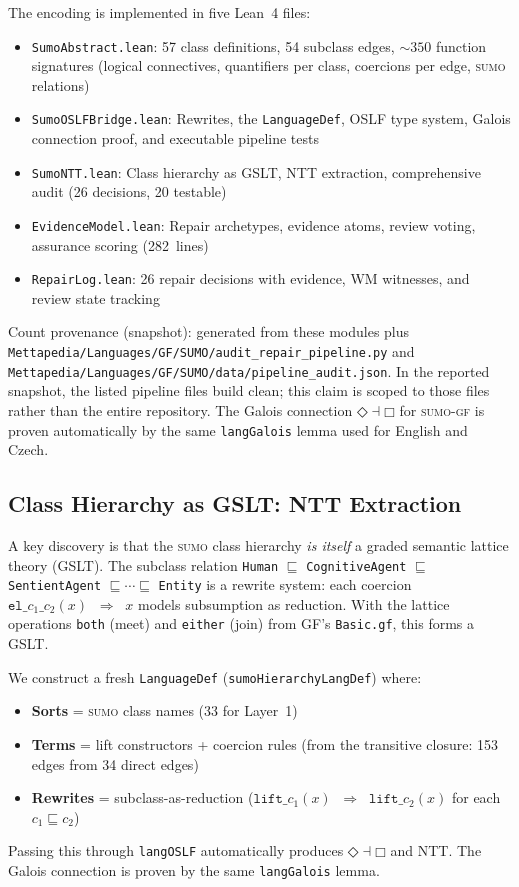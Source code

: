 \documentclass[11pt]{article}
\newcommand{\DiamondOp}{\mathbin{\Diamond}}
\newcommand{\BoxOp}{\mathbin{\Box}}
\newcommand{\Red}{\;\Rightarrow\;}
\newcommand{\SUMO}{\textsc{sumo}}
\newcommand{\GF}{\textsc{gf}}
\theoremstyle{definition}
\theoremstyle{plain}
\begin{document}
The encoding is implemented in five Lean~4 files:
\begin{itemize}[nosep]
  \item \texttt{SumoAbstract.lean}: 57 class definitions, 54 subclass
    edges, ${\sim}350$ function signatures (logical connectives,
    quantifiers per class, coercions per edge, \SUMO{} relations)
  \item \texttt{SumoOSLFBridge.lean}: Rewrites, the
    \texttt{LanguageDef}, OSLF type system, Galois connection proof,
    and executable pipeline tests
  \item \texttt{SumoNTT.lean}: Class hierarchy as GSLT, NTT
    extraction, comprehensive audit (26 decisions, 20 testable)
  \item \texttt{EvidenceModel.lean}: Repair archetypes, evidence
    atoms, review voting, assurance scoring (282~lines)
  \item \texttt{RepairLog.lean}: 26 repair decisions with evidence,
    WM witnesses, and review state tracking
\end{itemize}
Count provenance (snapshot): generated from these modules plus
\texttt{Mettapedia/Languages/GF/SUMO/audit\_repair\_pipeline.py} and
\texttt{Mettapedia/Languages/GF/SUMO/data/pipeline\_audit.json}.
In the reported snapshot, the listed pipeline files build clean; this claim is
scoped to those files rather than the entire repository.  The Galois connection
$\DiamondOp \dashv \BoxOp$ for \SUMO{}-\GF{} is proven automatically
by the same \texttt{langGalois} lemma used for English and Czech.

\subsection{Class Hierarchy as GSLT: NTT Extraction}
\label{sec:ntt-extraction}

A key discovery is that the \SUMO{} class hierarchy \emph{is itself}
a graded semantic lattice theory (GSLT).  The subclass relation
\texttt{Human} $\sqsubseteq$ \texttt{CognitiveAgent} $\sqsubseteq$
\texttt{SentientAgent} $\sqsubseteq \cdots \sqsubseteq$
\texttt{Entity} is a rewrite system: each coercion
$\texttt{el\_}c_1\texttt{\_}c_2(x) \;\Red\; x$ models subsumption as
reduction.  With the lattice operations \texttt{both} (meet) and
\texttt{either} (join) from GF's \texttt{Basic.gf}, this forms a GSLT.

We construct a fresh \texttt{LanguageDef} (\texttt{sumoHierarchyLangDef})
where:
\begin{itemize}[nosep]
  \item \textbf{Sorts} = \SUMO{} class names (33 for Layer~1)
  \item \textbf{Terms} = lift constructors + coercion rules
    (from the transitive closure: 153 edges from 34 direct edges)
  \item \textbf{Rewrites} = subclass-as-reduction
    ($\texttt{lift\_}c_1(x) \;\Red\; \texttt{lift\_}c_2(x)$
    for each $c_1 \sqsubseteq c_2$)
\end{itemize}
Passing this through \texttt{langOSLF} automatically produces
$\DiamondOp \dashv \BoxOp$ and NTT\@.  The Galois connection is proven
by the same \texttt{langGalois} lemma.
\end{document}
